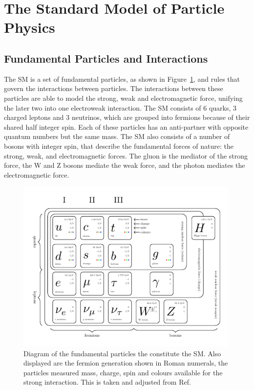 \section{The Standard Model of Particle Physics}

\subsection{Fundamental Particles and Interactions}

The \ac{SM} is a set of fundamental particles, as shown in Figure~\ref{fig:sm_diagram}, and rules that govern the interactions between particles.
The interactions between these particles are able to model the strong, weak and electromagnetic force, unifying the later two into one electroweak interaction.
The \ac{SM} consists of 6 quarks, 3 charged leptons and 3 neutrinos, which are grouped into fermions because of their shared half integer spin. 
Each of these particles has an anti-partner with opposite quantum numbers but the same mass.
The \ac{SM} also consists of a number of bosons with integer spin, that describe the fundamental forces of nature: the strong, weak, and electromagnetic forces. 
The gluon is the mediator of the strong force, the W and Z bosons mediate the weak force, and the photon mediates the electromagnetic force. \\

\begin{figure}[!hbtp]
\centering
    \includegraphics[width=0.99\textwidth]{Figures/SM_diagram.pdf}
\caption{Diagram of the fundamental particles the constitute the SM. Also displayed are the fermion generation shown in Roman numerals, the particles measured mass, charge, spin and colours available for the strong interaction. This is taken and adjusted from Ref.~\cite{sm_diagram}}
\label{fig:sm_diagram}
\end{figure}


